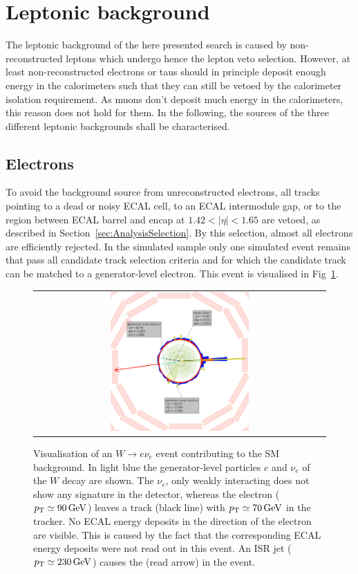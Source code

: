 \section{Leptonic background}
\label{sec:LeptonicBkg}

The leptonic background of the here presented search is caused by non-reconstructed leptons which undergo hence the lepton veto selection.
However, at least non-reconstructed electrons or taus should in principle deposit enough energy in the calorimeters such that they can still be vetoed by the calorimeter isolation requirement.
As muons don't deposit much energy in the calorimeters, this reason does not hold for them.
In the following, the sources of the three different leptonic backgrounds shall be characterised.

\subsection*{Electrons}
To avoid the background source from unreconstructed electrons, all tracks pointing to a dead or noisy ECAL cell, to an ECAL intermodule gap, or to the region between ECAL barrel and encap at $1.42<|\eta|<1.65$ are vetoed, 
as described in Section~\ref{sec:AnalysisSelection}.
By this selection, almost all electrons are efficiently rejected.
In the simulated \WJets sample only one simulated event remains that pass all candidate track selection criteria and for which the candidate track can be matched to a generator-level electron.
This event is visualised in Fig~\ref{fig:LostElectron}. 
\begin{figure}[!tb]
  \centering 
  \begin{tabular}{c}
    \includegraphics[width=0.49\textwidth]{figures/analysis/Electron_lumi_279317_event_111637553.png}
  \end{tabular}
 \caption{Visualisation of an $W\rightarrow e\nu_e$ event contributing to the SM background. 
           In light blue the generator-level particles $e$ and $\nu_e$ of the $W$ decay are shown. 
           The $\nu_e$, only weakly interacting does not show any signature in the detector, whereas the electron ($p_{\text{T}}\simeq 90\,\text{Ge}\kern-0.06667em\text{V}$) leaves a track (black line) with \mbox{$p_{\text{T}}\simeq 70\,\text{Ge}\kern-0.06667em\text{V}$} in the tracker. 
           No ECAL energy deposits in the direction of the electron are visible. 
           This is caused by the fact that the corresponding ECAL energy deposits were not read out in this event.
           An ISR jet ($p_{\text{T}}\simeq 230\,\text{Ge}\kern-0.06667em\text{V}$) causes the \met (read arrow) in the event. }
  \label{fig:LostElectron}
\end{figure}
 
